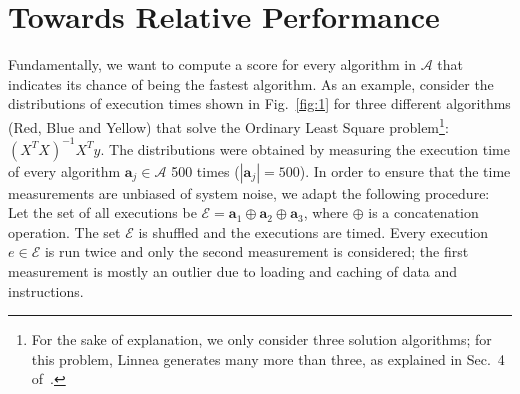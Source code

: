 \documentclass[conference]{IEEEtran}
\newcommand{\p}[1]{{\color{blue} Pdj: #1}}
\begin{document}
\section{Towards Relative Performance}
\label{sec:torel}
Fundamentally, we want to compute a score for every algorithm in $\mathcal{A}$ that indicates its chance of being the fastest algorithm. As an example, consider the distributions of execution times shown in Fig.~\ref{fig:1} for three different algorithms (Red, Blue and
Yellow) that solve the Ordinary Least Square problem\footnote{For the sake of
  explanation, we only consider three solution algorithms; for this problem, Linnea generates many more than three,
  as explained in Sec.~4 of~\cite{barthels2019linnea}.}: $(X^TX)^{-1}X^{T}y$. 
The distributions were obtained by measuring the execution time of every algorithm $\mathbf{a}_j \in \mathcal{A}$ 500 times ($|\mathbf{a}_j| = 500$).
In order to ensure that the time measurements are unbiased of system noise, we adapt the following procedure: Let the set of all executions be $\mathcal{E} = \mathbf{a}_1 \oplus \mathbf{a}_2 \oplus \mathbf{a}_3$, where $\oplus$
is a concatenation operation. The set $\mathcal{E}$ is shuffled and the executions are timed. Every execution $e \in
\mathcal{E}$ is run twice and only the second measurement is considered; the first measurement is mostly an outlier due
to loading and caching of data and instructions\cite{peise2019elaps}. 
\end{document}
